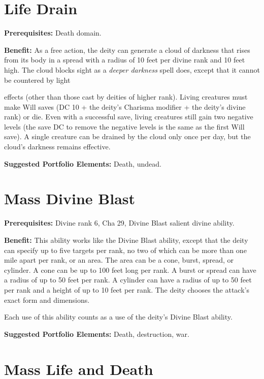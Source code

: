 \documentclass{article}
\begin{document}
\vspace{12pt}
\section*{Life Drain}

\textbf{Prerequisites:} Death domain.

\textbf{Benefit:} As a free action, the deity can generate a cloud of darkness 
that rises from its body in a spread with a radius of 10 feet per divine rank and 
10 feet high. The cloud blocks sight as a \textit{deeper darkness }spell does, 
except that it cannot be countered by light

effects (other than those cast by deities of higher rank). Living creatures must 
make Will saves (DC 10 + the deity's Charisma modifier + the deity's divine rank) 
or die. Even with a successful save, living creatures still gain two negative levels 
(the save DC to remove the negative levels is the same as the first Will save). 
A single creature can be drained by the cloud only once per day, but the cloud's 
darkness remains effective.

\textbf{Suggested Portfolio Elements:} Death, undead.

\vspace{12pt}
\section*{Mass Divine Blast}

\textbf{Prerequisites:} Divine rank 6, Cha 29, Divine Blast salient divine ability.

\textbf{Benefit:} This ability works like the Divine Blast ability, except that 
the deity can specify up to five targets per rank, no two of which can be more 
than one mile apart per rank, or an area. The area can be a cone, burst, spread, 
or cylinder. A cone can be up to 100 feet long per rank. A burst or spread can 
have a radius of up to 50 feet per rank. A cylinder can have a radius of up to 
50 feet per rank and a height of up to 10 feet per rank. The deity chooses the 
attack's exact form and dimensions.

Each use of this ability counts as a use of the deity's Divine Blast ability.

\textbf{Suggested Portfolio Elements:} Death, destruction, war.

\vspace{12pt}
\section*{Mass Life and Death}
\end{document}

